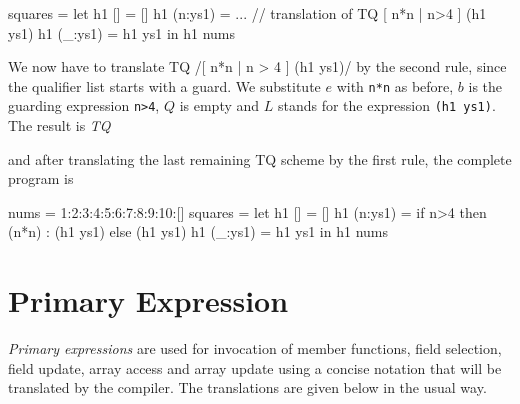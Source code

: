 \begin{code}
squares = let
   h1 [] = []
   h1 (n:ys1) = ... // translation of TQ [ n*n | n>4 ] (h1 ys1)
   h1 (_:ys1) = h1 ys1
 in h1 nums
\end{code}

We now have to translate TQ \ex/[ n*n | n > 4 ] (h1 ys1)/ by the second rule, since the qualifier list starts with a guard. We substitute $e$ with \texttt{n*n} as before, $b$ is the guarding expression \texttt{n>4}, $Q$ is empty and $L$ stands for the expression \texttt{(h1 ys1)}.
The result is 
 \emph{TQ} 

and after translating the last remaining TQ scheme by the first rule, the complete program is

\begin{code}
nums = 1:2:3:4:5:6:7:8:9:10:[]
squares = let
   h1 [] = []
   h1 (n:ys1) = if n>4 then (n*n) : (h1 ys1) else (h1 ys1)
   h1 (_:ys1) = h1 ys1
 in h1 nums
\end{code}



\section{Primary Expression} \label{primexp} 

\emph{Primary expressions} are used for invocation of member functions, field selection, field update, array access and array update using a concise notation that will be translated by the compiler. The translations are given below in the usual way.

